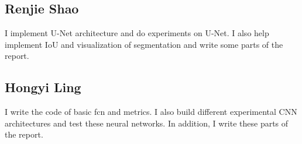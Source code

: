 \documentclass{article} %
\begin{document}
\subsection*{Renjie Shao}
I implement U-Net architecture and do experiments on U-Net. I also help implement IoU and visualization of segmentation and write some parts of the report.
\subsection*{Hongyi Ling}
I write the code of basic fcn and metrics. I also build different experimental CNN architectures and test these neural networks. In addition, I write these parts of the report.



\end{document}
